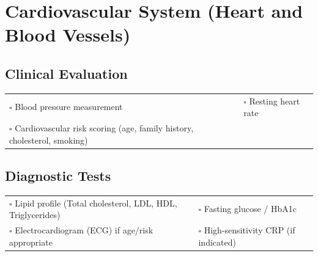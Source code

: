 
\section{Cardiovascular System (Heart and Blood Vessels)}
\label{sec:cardio}

\subsection{Clinical Evaluation}

\begin{tabular}{p{9cm} p{8cm}}
$\square$ Blood pressure measurement & $\square$ Resting heart rate \\ 
$\square$ Cardiovascular risk scoring (age, family history, cholesterol, smoking) & \\ 
\end{tabular}

\subsection{Diagnostic Tests}

\begin{tabular}{p{9cm} p{8cm}}
$\square$ Lipid profile (Total cholesterol, LDL, HDL, Triglycerides) & $\square$ Fasting glucose / HbA1c \\ 
$\square$ Electrocardiogram (ECG) if age/risk appropriate & $\square$ High-sensitivity CRP (if indicated) \\ 
\end{tabular}

